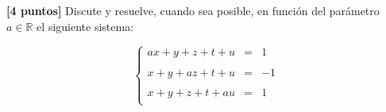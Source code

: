 \documentclass[12pt]{article}
\begin{document}
    \begin{ejercicio}\textbf{[4 puntos]}
    Discute y resuelve, cuando sea posible, en función del parámetro $a\in \mathbb{R}$ el siguiente sistema:

    $$
        \left\{
        \begin{array}{rcl}
            ax + y + z + t + u &=& 1  \\
            \\
            x + y + az + t + u &=& -1  \\
            \\
            x + y + z + t + au &=& 1  \\
        \end{array}
        \right.
    $$
    \end{ejercicio}
\end{document}
